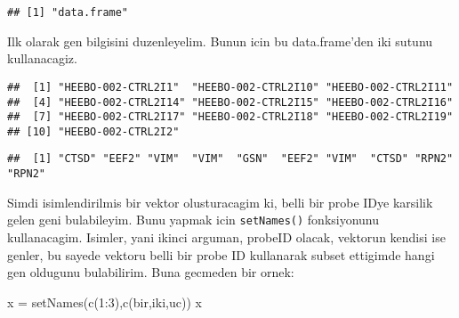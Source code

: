 \documentclass[
]{book}
\newenvironment{Shaded}{\begin{snugshade}}{\end{snugshade}}
\newcommand{\DecValTok}[1]{\textcolor[rgb]{0.00,0.00,0.81}{#1}}
\newcommand{\FunctionTok}[1]{\textcolor[rgb]{0.00,0.00,0.00}{#1}}
\newcommand{\NormalTok}[1]{#1}
\newcommand{\OtherTok}[1]{\textcolor[rgb]{0.56,0.35,0.01}{#1}}
\newcommand{\SpecialCharTok}[1]{\textcolor[rgb]{0.00,0.00,0.00}{#1}}
\newcommand{\StringTok}[1]{\textcolor[rgb]{0.31,0.60,0.02}{#1}}
\begin{document}
\begin{verbatim}
## [1] "data.frame"
\end{verbatim}

Ilk olarak gen bilgisini duzenleyelim. Bunun icin bu data.frame'den iki sutunu kullanacagiz.

\begin{Shaded}
\end{Shaded}

\begin{verbatim}
##  [1] "HEEBO-002-CTRL2I1"  "HEEBO-002-CTRL2I10" "HEEBO-002-CTRL2I11"
##  [4] "HEEBO-002-CTRL2I14" "HEEBO-002-CTRL2I15" "HEEBO-002-CTRL2I16"
##  [7] "HEEBO-002-CTRL2I17" "HEEBO-002-CTRL2I18" "HEEBO-002-CTRL2I19"
## [10] "HEEBO-002-CTRL2I2"
\end{verbatim}

\begin{Shaded}
\end{Shaded}

\begin{verbatim}
##  [1] "CTSD" "EEF2" "VIM"  "VIM"  "GSN"  "EEF2" "VIM"  "CTSD" "RPN2" "RPN2"
\end{verbatim}

Simdi isimlendirilmis bir vektor olusturacagim ki, belli bir probe IDye karsilik gelen geni bulabileyim. Bunu yapmak icin \texttt{setNames()} fonksiyonunu kullanacagim. Isimler, yani ikinci arguman, probeID olacak, vektorun kendisi ise genler, bu sayede vektoru belli bir probe ID kullanarak subset ettigimde hangi gen oldugunu bulabilirim. Buna gecmeden bir ornek:

\begin{Shaded}
\begin{Highlighting}[]
\NormalTok{x }\OtherTok{=} \FunctionTok{setNames}\NormalTok{(}\FunctionTok{c}\NormalTok{(}\DecValTok{1}\SpecialCharTok{:}\DecValTok{3}\NormalTok{),}\FunctionTok{c}\NormalTok{(}\StringTok{\textquotesingle{}bir\textquotesingle{}}\NormalTok{,}\StringTok{\textquotesingle{}iki\textquotesingle{}}\NormalTok{,}\StringTok{\textquotesingle{}uc\textquotesingle{}}\NormalTok{))}
\NormalTok{x}
\end{Highlighting}
\end{Shaded}
\end{document}
